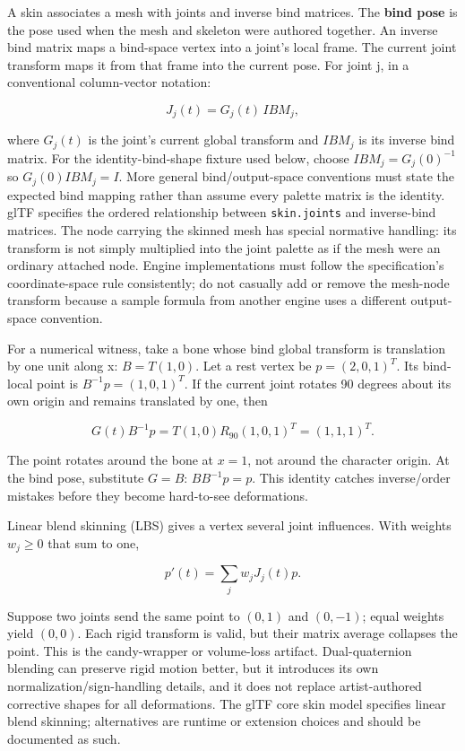 A skin associates a mesh with joints and inverse bind matrices. The \textbf{bind pose} is the pose used when the mesh and skeleton were authored together. An inverse bind matrix maps a bind-space vertex into a joint's local frame. The current joint transform maps it from that frame into the current pose. For joint j, in a conventional column-vector notation:

\[
J_j(t)=G_j(t)\,IBM_j,
\]

where \(G_j(t)\) is the joint's current global transform and \(IBM_j\) is its inverse bind matrix. For the identity-bind-shape fixture used below, choose \(IBM_j=G_j(0)^{-1}\) so \(G_j(0)IBM_j=I\). More general bind/output-space conventions must state the expected bind mapping rather than assume every palette matrix is the identity. glTF specifies the ordered relationship between \texttt{skin.joints} and inverse-bind matrices. The node carrying the skinned mesh has special normative handling: its transform is not simply multiplied into the joint palette as if the mesh were an ordinary attached node. Engine implementations must follow the specification's coordinate-space rule consistently; do not casually add or remove the mesh-node transform because a sample formula from another engine uses a different output-space convention.

For a numerical witness, take a bone whose bind global transform is translation by one unit along x: \(B=T(1,0)\). Let a rest vertex be \(p=(2,0,1)^T\). Its bind-local point is \(B^{-1}p=(1,0,1)^T\). If the current joint rotates 90 degrees about its own origin and remains translated by one, then

\[
G(t)B^{-1}p=T(1,0)R_{90}(1,0,1)^T=(1,1,1)^T.
\]

The point rotates around the bone at \(x=1\), not around the character origin. At the bind pose, substitute \(G=B\): \(BB^{-1}p=p\). This identity catches inverse/order mistakes before they become hard-to-see deformations.

Linear blend skinning (LBS) gives a vertex several joint influences. With weights \(w_j\ge0\) that sum to one,

\[
p'(t)=\sum_jw_jJ_j(t)p.
\]

Suppose two joints send the same point to \((0,1)\) and \((0,-1)\); equal weights yield \((0,0)\). Each rigid transform is valid, but their matrix average collapses the point. This is the candy-wrapper or volume-loss artifact. Dual-quaternion blending can preserve rigid motion better, but it introduces its own normalization/sign-handling details, and it does not replace artist-authored corrective shapes for all deformations. The glTF core skin model specifies linear blend skinning; alternatives are runtime or extension choices and should be documented as such.

